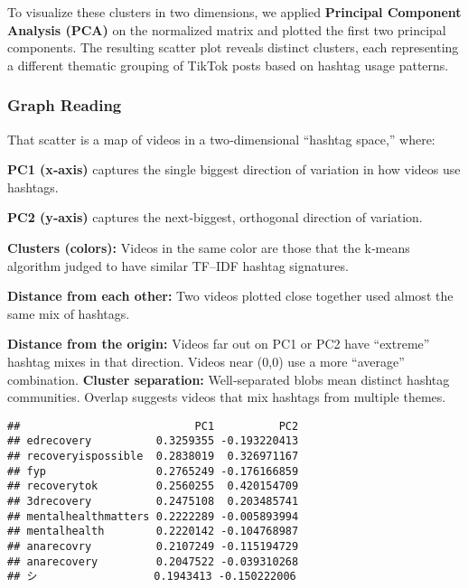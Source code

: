 \documentclass[
]{article}
\newenvironment{Shaded}{\begin{snugshade}}{\end{snugshade}}
\newcommand{\CommentTok}[1]{\textcolor[rgb]{0.56,0.35,0.01}{\textit{#1}}}
\newcommand{\DecValTok}[1]{\textcolor[rgb]{0.00,0.00,0.81}{#1}}
\newcommand{\FunctionTok}[1]{\textcolor[rgb]{0.13,0.29,0.53}{\textbf{#1}}}
\newcommand{\NormalTok}[1]{#1}
\newcommand{\OtherTok}[1]{\textcolor[rgb]{0.56,0.35,0.01}{#1}}
\newcommand{\SpecialCharTok}[1]{\textcolor[rgb]{0.81,0.36,0.00}{\textbf{#1}}}
\begin{document}
To visualize these clusters in two dimensions, we applied
\textbf{Principal Component Analysis (PCA)} on the normalized matrix and
plotted the first two principal components. The resulting scatter plot
reveals distinct clusters, each representing a different thematic
grouping of TikTok posts based on hashtag usage patterns.

\subsubsection{Graph Reading}\label{graph-reading}

That scatter is a map of videos in a two‑dimensional ``hashtag space,''
where:

\textbf{PC1 (x‑axis)} captures the single biggest direction of variation
in how videos use hashtags.

\textbf{PC2 (y‑axis)} captures the next‑biggest, orthogonal direction of
variation.

\textbf{Clusters (colors):} Videos in the same color are those that the
k‑means algorithm judged to have similar TF--IDF hashtag signatures.

\textbf{Distance from each other:} Two videos plotted close together
used almost the same mix of hashtags.

\textbf{Distance from the origin:} Videos far out on PC1 or PC2 have
``extreme'' hashtag mixes in that direction. Videos near (0,0) use a
more ``average'' combination. \textbf{Cluster separation:}
Well‑separated blobs mean distinct hashtag communities. Overlap suggests
videos that mix hashtags from multiple themes.

\begin{Shaded}
\end{Shaded}

\begin{verbatim}
##                           PC1          PC2
## edrecovery          0.3259355 -0.193220413
## recoveryispossible  0.2838019  0.326971167
## fyp                 0.2765249 -0.176166859
## recoverytok         0.2560255  0.420154709
## 3drecovery          0.2475108  0.203485741
## mentalhealthmatters 0.2222289 -0.005893994
## mentalhealth        0.2220142 -0.104768987
## anarecovry          0.2107249 -0.115194729
## anarecovery         0.2047522 -0.039310268
## シ                  0.1943413 -0.150222006
\end{verbatim}
\end{document}
